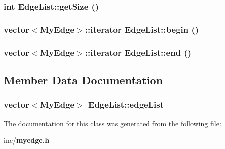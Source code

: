\subsubsection{\setlength{\rightskip}{0pt plus 5cm}int EdgeList::getSize ()\hspace{0.3cm}{\tt  [inline]}}\label{classEdgeList_f9abf777950110154da92cdf0c44cc1a}


\subsubsection{\setlength{\rightskip}{0pt plus 5cm}vector$<${\bf MyEdge}$>$::iterator EdgeList::begin ()\hspace{0.3cm}{\tt  [inline]}}\label{classEdgeList_a1c1228a6afaf8d89a42ee82b1e977cd}


\subsubsection{\setlength{\rightskip}{0pt plus 5cm}vector$<${\bf MyEdge}$>$::iterator EdgeList::end ()\hspace{0.3cm}{\tt  [inline]}}\label{classEdgeList_f0e89346b62e539d638a8656780bfeee}




\subsection{Member Data Documentation}
\subsubsection{\setlength{\rightskip}{0pt plus 5cm}vector$<${\bf MyEdge}$>$ {\bf EdgeList::edgeList}\hspace{0.3cm}{\tt  [private]}}\label{classEdgeList_22d4d9791737cdb8d0c44476e572c622}




The documentation for this class was generated from the following file:\begin{CompactItemize}
\item 
inc/{\bf myedge.h}\end{CompactItemize}
